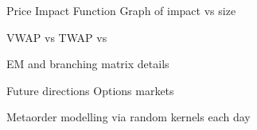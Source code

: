 \documentclass[usenames,dvipsnames,handout]{beamer}
\begin{document}
\begin{frame}{Price Impact Function}
	Graph of impact vs size

	VWAP vs TWAP vs 
\end{frame}

\begin{frame}{EM and branching matrix details}
\end{frame}

\begin{frame}{Future directions}
	Options markets

	Metaorder modelling via random kernels each day
\end{frame}
\end{document}
